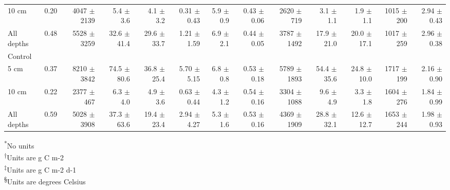 \begin{longtable}{lrrrrrrrrrrrr}
10 cm & 0.20 & 4047 $\pm$ 2139 & 5.4 $\pm$ 3.6 & 4.1 $\pm$ 3.2 & 0.31 $\pm$ 0.43 & 5.9 $\pm$ 0.9 & 0.43 $\pm$ 0.06 & 2620 $\pm$ 719 & 3.1 $\pm$ 1.1 & 1.9 $\pm$ 1.1 & 1015 $\pm$ 200 & 2.94 $\pm$ 0.43 \\ 
All depths & 0.48 & 5528 $\pm$ 3259 & 32.6 $\pm$ 41.4 & 29.6 $\pm$ 33.7 & 1.21 $\pm$ 1.59 & 6.9 $\pm$ 2.1 & 0.44 $\pm$ 0.05 & 3787 $\pm$ 1492 & 17.9 $\pm$ 21.0 & 20.0 $\pm$ 17.1 & 1017 $\pm$ 259 & 2.96 $\pm$ 0.38 \\ 
\midrule
\multicolumn{1}{l}{Control} \\ 
\midrule
5 cm & 0.37 & 8210 $\pm$ 3842 & 74.5 $\pm$ 80.6 & 36.8 $\pm$ 25.4 & 5.70 $\pm$ 5.15 & 6.8 $\pm$ 0.8 & 0.53 $\pm$ 0.18 & 5789 $\pm$ 1893 & 54.4 $\pm$ 35.6 & 24.8 $\pm$ 10.0 & 1717 $\pm$ 199 & 2.16 $\pm$ 0.90 \\ 
10 cm & 0.22 & 2377 $\pm$ 467 & 6.3 $\pm$ 4.0 & 4.9 $\pm$ 3.6 & 0.63 $\pm$ 0.44 & 4.3 $\pm$ 1.2 & 0.54 $\pm$ 0.16 & 3304 $\pm$ 1088 & 9.6 $\pm$ 4.9 & 3.3 $\pm$ 1.8 & 1604 $\pm$ 276 & 1.84 $\pm$ 0.99 \\ 
All depths & 0.59 & 5028 $\pm$ 3908 & 37.3 $\pm$ 63.6 & 19.4 $\pm$ 23.4 & 2.94 $\pm$ 4.27 & 5.3 $\pm$ 1.6 & 0.53 $\pm$ 0.16 & 4369 $\pm$ 1909 & 28.8 $\pm$ 32.1 & 12.6 $\pm$ 12.7 & 1653 $\pm$ 244 & 1.98 $\pm$ 0.93 \\ 
 \bottomrule
\end{longtable}
\vspace{-5mm}
\begin{minipage}{\linewidth}
\textsuperscript{*}No units \\ 
\textsuperscript{†}Units are g C m-2 \\ 
\textsuperscript{‡}Units are g C m-2 d-1 \\ 
\textsuperscript{§}Units are degrees Celsius \\ 
\end{minipage}

